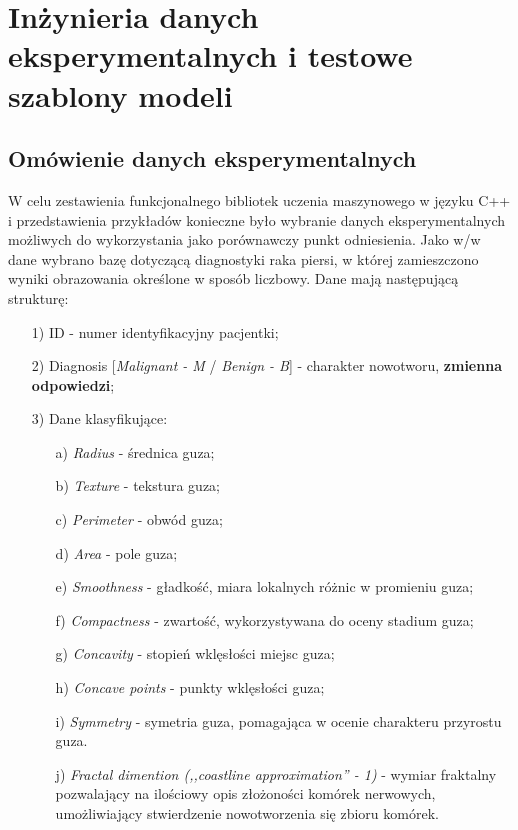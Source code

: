 \chapter{Inżynieria danych eksperymentalnych i testowe szablony modeli}
\section{Omówienie danych eksperymentalnych}
	
	W celu zestawienia funkcjonalnego bibliotek uczenia maszynowego w języku C++ i przedstawienia przykładów konieczne było wybranie danych eksperymentalnych możliwych do wykorzystania jako porównawczy punkt odniesienia. Jako w/w dane wybrano bazę dotyczącą diagnostyki raka piersi, w której zamieszczono wyniki obrazowania określone w sposób liczbowy. Dane mają następującą strukturę:
	
	\begin{enumerate}
		\item [1)] ID - numer identyfikacyjny pacjentki;
		\item [2)] Diagnosis [\textit{Malignant - M} / \textit{Benign - B}] - charakter nowotworu, \textbf{zmienna odpowiedzi};
		\item [3)] Dane klasyfikujące:
			\begin{enumerate}
				\item [a)] \textit{Radius} - średnica guza;
				\item [b)] \textit{Texture} - tekstura guza;
				\item [c)] \textit{Perimeter} - obwód guza;
				\item [d)] \textit{Area} - pole guza;
				\item [e)] \textit{Smoothness} - gładkość, miara lokalnych różnic w promieniu guza;
				\item [f)] \textit{Compactness} - zwartość, wykorzystywana do oceny stadium guza;
				\item [g)] \textit{Concavity} - stopień wklęsłości miejsc guza;
				\item [h)] \textit{Concave points} - punkty wklęsłości guza;
				\item [i)] \textit{Symmetry} - symetria guza, pomagająca w ocenie charakteru przyrostu guza.
				\item [j)] \textit{Fractal dimention (,,coastline approximation'' - 1)} - wymiar fraktalny pozwalający na ilościowy opis złożoności komórek nerwowych, umożliwiający stwierdzenie nowotworzenia się zbioru komórek.
			\end{enumerate}
	\end{enumerate}
	
